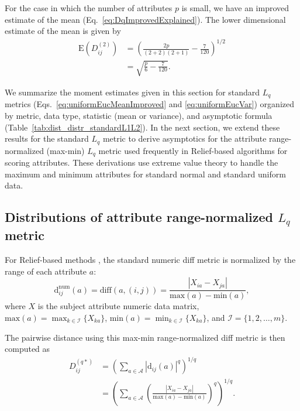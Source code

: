 \documentclass[aos]{imsart}
\begin{document}
For the case in which the number of attributes $p$ is small, we have an improved estimate of the mean (Eq.~\ref{eq:DqImprovedExplained}). The lower dimensional estimate of the mean is given by
%
\begin{equation}\label{eq:uniformEucMeanImproved}
\begin{aligned}
\text{E}\left(D^{(2)}_{ij}\right) &= \left(\frac{2p}{(2+2)(2+1)} - \frac{7}{120}\right)^{1/2} \\
&= \sqrt{\frac{p}{6} - \frac{7}{120}}.
\end{aligned}
\end{equation}

We summarize the moment estimates given in this section for standard $L_q$ metrics (Eqs.~\ref{eq:uniformEucMeanImproved} and \ref{eq:uniformEucVar}) organized by metric, data type, statistic (mean or variance), and asymptotic formula (Table~\ref{tab:dist_distr_standardL1L2}). In the next section, we extend these results for the standard $L_q$ metric to derive asymptotics for the attribute range-normalized (max-min) $L_q$ metric used frequently in Relief-based algorithms \cite{urbanowicz17,robnik2003} for scoring attributes. These derivations use extreme value theory to handle the maximum and minimum attributes for standard normal and standard uniform data.  

\subsection{Distributions of attribute range-normalized \texorpdfstring{$L_q$}{} metric}\label{sec:extremes}

For Relief-based methods \cite{robnik2003,urbanowicz17}, the standard numeric diff metric is normalized by the range of each attribute $a$:
%
\begin{equation}\label{eq:normDiff}
\text{d}^{\text{num}}_{ij}(a) = \text{diff}(a,(i,j)) = \frac{|X_{ia} - X_{ja}|}{\text{max}(a) - \text{min}(a)},
\end{equation}
%
where $X$ is the subject attribute numeric data matrix, $\text{max}(a) = \displaystyle \max_{k \in \mathcal{I}}\{X_{ka}\}$, $\text{min}(a) = \displaystyle \min_{k \in \mathcal{I}}\{X_{ka}\}$, and $\mathcal{I} = \{1,2,\dots,m\}$. 

The pairwise distance using this max-min range-normalized diff metric is then computed as
%
\begin{equation}\label{eq:D*}
\begin{aligned}
D^{(q*)}_{ij} &= \left(\sum_{a\in \mathcal{A}}|\text{d}_{ij}(a)|^q\right)^{1/q} \\
&= \left(\sum_{a\in \mathcal{A}}\left(\frac{|X_{ia} - X_{ja}|}{\text{max}(a) - \text{min}(a)}\right)^q\right)^{1/q}.
\end{aligned}
\end{equation}
\end{document}
